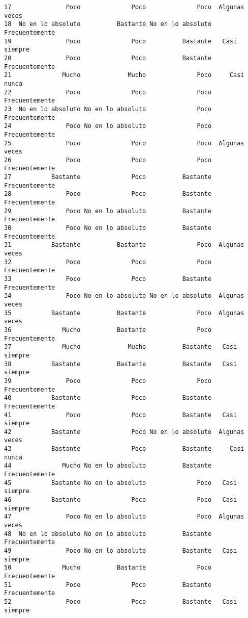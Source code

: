 \documentclass[
  letterpaper,
  DIV=11,
  numbers=noendperiod]{scrartcl}
\begin{document}
\begin{verbatim}
17               Poco              Poco              Poco  Algunas veces
18  No en lo absoluto          Bastante No en lo absoluto Frecuentemente
19               Poco              Poco          Bastante   Casi siempre
20               Poco              Poco          Bastante Frecuentemente
21              Mucho             Mucho              Poco     Casi nunca
22               Poco              Poco              Poco Frecuentemente
23  No en lo absoluto No en lo absoluto              Poco Frecuentemente
24               Poco No en lo absoluto              Poco Frecuentemente
25               Poco              Poco              Poco  Algunas veces
26               Poco              Poco              Poco Frecuentemente
27           Bastante              Poco          Bastante Frecuentemente
28               Poco              Poco          Bastante Frecuentemente
29               Poco No en lo absoluto          Bastante Frecuentemente
30               Poco No en lo absoluto          Bastante Frecuentemente
31           Bastante          Bastante              Poco  Algunas veces
32               Poco              Poco              Poco Frecuentemente
33               Poco              Poco          Bastante Frecuentemente
34               Poco No en lo absoluto No en lo absoluto  Algunas veces
35           Bastante          Bastante              Poco  Algunas veces
36              Mucho          Bastante              Poco Frecuentemente
37              Mucho             Mucho          Bastante   Casi siempre
38           Bastante          Bastante          Bastante   Casi siempre
39               Poco              Poco              Poco Frecuentemente
40           Bastante              Poco          Bastante Frecuentemente
41               Poco              Poco          Bastante   Casi siempre
42           Bastante              Poco No en lo absoluto  Algunas veces
43           Bastante              Poco          Bastante     Casi nunca
44              Mucho No en lo absoluto          Bastante Frecuentemente
45           Bastante No en lo absoluto              Poco   Casi siempre
46           Bastante              Poco              Poco   Casi siempre
47               Poco No en lo absoluto              Poco  Algunas veces
48  No en lo absoluto No en lo absoluto          Bastante Frecuentemente
49               Poco No en lo absoluto          Bastante   Casi siempre
50              Mucho          Bastante              Poco Frecuentemente
51               Poco              Poco          Bastante Frecuentemente
52               Poco              Poco          Bastante   Casi siempre

\end{verbatim}
\end{document}
